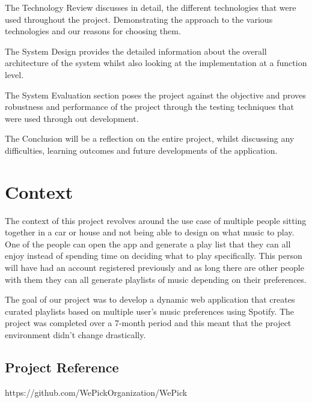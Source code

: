 The Technology Review discusses in detail, the different technologies that were used throughout the project. Demonstrating the approach to the various technologies and our reasons for choosing them.\newline

The System Design provides the detailed information about the overall architecture of the system whilst also looking at the implementation at a function level.\newline

The System Evaluation section poses the project against the objective and proves robustness and performance of the project through the testing techniques that were used through out development.\newline

The Conclusion will be a reflection on the entire project, whilst discussing any difficulties, learning outcomes and future developments of the application.
\chapter{Context}
The context of this project revolves around the use case of multiple people sitting together in a car or house and not being able to design on what music to play. One of the people can open the app and generate a play list that they can all enjoy instead of spending time on deciding what to play specifically.
This person will have had an account registered previously and as long there are other people with them they can all generate playlists of music depending on their preferences.\newline

The goal of our project was to develop a dynamic web application that creates curated playlists based on multiple user's music preferences using Spotify.
The project was completed over a 7-month period and this meant that the project environment didn’t change drastically.

\section{Project Reference}
https://github.com/WePickOrganization/WePick

